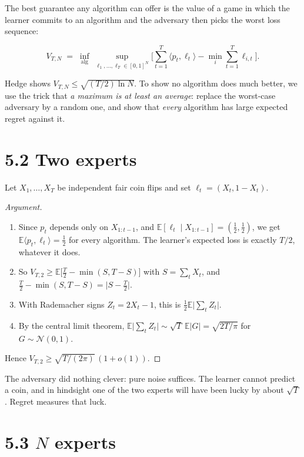 \documentclass[11pt,a4paper,openany]{book}
\newcommand{\E}{\mathbb{E}}
\newcommand{\ip}[2]{\langle #1,#2\rangle}
\newcommand{\abs}[1]{\lvert #1\rvert}
\begin{document}
The best guarantee any algorithm can offer is the value of a game in which the learner commits to an algorithm and the adversary then picks the worst loss sequence:

\[V_{T,N}\;=\;\inf_{\text{alg}}\ \sup_{\ell_1,\dots,\ell_T\in[0,1]^N}\Big[\sum_{t=1}^T\ip{p_t}{\ell_t}-\min_i\sum_{t=1}^T\ell_{i,t}\Big].\]

Hedge shows $V_{T,N}\le\sqrt{(T/2)\ln N}$. To show no algorithm does much better, we use the trick that \emph{a maximum is at least an average}: replace the worst-case adversary by a random one, and show that \emph{every} algorithm has large expected regret against it.

\section*{5.2 Two experts}\label{ch5-two}

Let $X_1,\dots,X_T$ be independent fair coin flips and set $\ell_t=(X_t,1-X_t)$.

\begin{proof}[Argument]
\begin{enumerate}
\item Since $p_t$ depends only on $X_{1:t-1}$, and $\E[\ell_t\mid X_{1:t-1}]=(\tfrac12,\tfrac12)$, we get $\E\ip{p_t}{\ell_t}=\tfrac12$ for every algorithm. The learner's expected loss is exactly $T/2$, whatever it does.
\item So $V_{T,2}\ge\E\big[\tfrac T2-\min(S,T-S)\big]$ with $S=\sum_tX_t$, and $\tfrac T2-\min(S,T-S)=\abs{S-\tfrac T2}$.
\item With Rademacher signs $Z_t=2X_t-1$, this is $\tfrac12\E\abs{\sum_tZ_t}$.
\item By the central limit theorem, $\E\abs{\sum_tZ_t}\sim\sqrt{T}\,\E\abs{G}=\sqrt{2T/\pi}$ for $G\sim\mathcal N(0,1)$.
\end{enumerate}

Hence $V_{T,2}\ge\sqrt{T/(2\pi)}\,(1+o(1))$.
\end{proof}

The adversary did nothing clever: pure noise suffices. The learner cannot predict a coin, and in hindsight one of the two experts will have been lucky by about $\sqrt T$. Regret measures that luck.

\section*{5.3 $N$ experts}\label{ch5-N}
\end{document}
